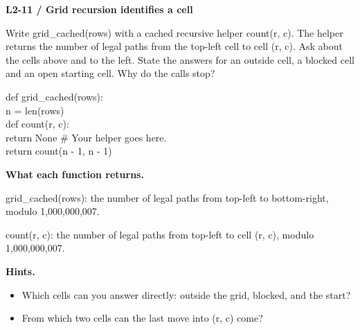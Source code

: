\documentclass[11pt,a4paper]{article}
\begin{document}
\par\noindent\begin{minipage}{\linewidth}
\textbf{L2-11 / Grid recursion identifies a cell}\par\smallskip Write grid\_cached(rows) with a cached recursive helper count(r, c). The helper returns the number of legal paths from the top-left cell to cell (r, c). Ask about the cells above and to the left. State the answers for an outside cell, a blocked cell and an open starting cell. Why do the calls stop?\par
\par{}\par\smallskip\noindent\colorbox{codepaper}{\parbox{\dimexpr\linewidth-2\fboxsep\relax}{\small\ttfamily\raggedright def grid\_cached(rows):\\\hspace*{2.4em}n = len(rows)\\\hspace*{2.4em}def count(r, c):\\\hspace*{4.8em}return None  \# Your helper goes here.\\\hspace*{2.4em}return count(n - 1, n - 1)}}\par
{\small\textbf{What each function returns.}\par grid\_cached(rows): the number of legal paths from top-left to bottom-right, modulo 1,000,000,007.\par count(r, c): the number of legal paths from top-left to cell (r, c), modulo 1,000,000,007.\par }
{\small\textbf{Hints.}}\begin{itemize}\item Which cells can you answer directly: outside the grid, blocked, and the start?\item From which two cells can the last move into (r, c) come?\end{itemize}
\end{minipage}\par\vspace{4mm}
\end{document}
